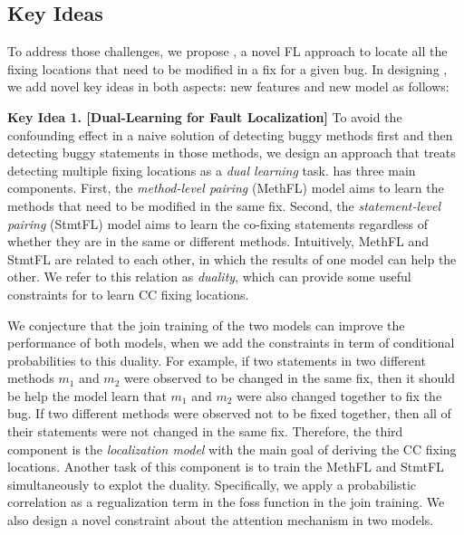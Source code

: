 \subsection{Key Ideas}
\label{sec:key-ideas}

To address those challenges, we propose {\tool}, a novel FL approach
to locate all the fixing locations that need to be modified in a fix
for a given bug. In designing {\tool}, we add novel key ideas in both
aspects: new features and new model as follows:

{\bf Key Idea 1. [Dual-Learning for Fault Localization]} To avoid the
confounding effect in a naive solution of detecting buggy methods
first and then detecting buggy statements in those methods, we design
an approach that treats detecting multiple fixing locations as a {\em
  dual learning} task. {\tool} has three main components. First, the
{\em method-level pairing} (MethFL) model aims to learn the methods
that need to be modified in the same fix. Second, the {\em
  statement-level pairing} (StmtFL) model aims to learn the co-fixing
statements regardless of whether they are in the same or different
methods. Intuitively, MethFL and StmtFL are related to each other, in
which the results of one model can help the other. We refer to this
relation as {\em duality}, which can provide some useful constraints
for {\tool} to learn CC fixing locations.

We conjecture that the join training of the two models can improve the
performance of both models, when we add the constraints in term of
conditional probabilities to this duality. For example, if two
statements in two different methods $m_1$ and $m_2$ were observed to
be changed in the same fix, then it should be help the model learn
that $m_1$ and $m_2$ were also changed together to fix the bug.  If
two different methods were observed not to be fixed together, then all
of their statements were not changed in the same fix. Therefore, the
third component is the {\em localization model} with the main goal of
deriving the CC fixing locations. Another task of this component is to
train the MethFL and StmtFL simultaneously to explot the
duality. Specifically, we apply a probabilistic correlation as a
regualization term in the foss function in the join training. We also
design a novel constraint about the attention mechanism in two models.





